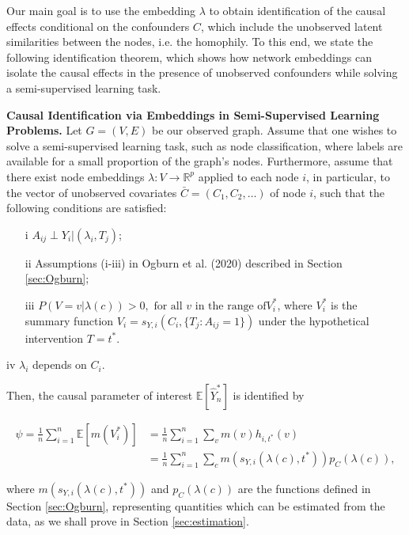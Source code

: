 \documentclass{article}
\begin{document}
Our main goal is to use the embedding $\lambda$ to obtain identification of the causal effects conditional on the confounders $C$, which include the unobserved latent similarities between the nodes, i.e. the homophily. To this end, we state the following identification theorem, which shows how network embeddings can isolate the causal effects in the presence of unobserved confounders while solving a semi-supervised learning task. 

\begin{theorem} \textbf{Causal Identification via Embeddings in Semi-Supervised Learning Problems.}
\label{thm:identification}
Let $G = (V, E)$ be our observed graph. Assume that one wishes to solve a semi-supervised learning task, such as node classification, where labels are available for a small proportion of the graph's nodes. Furthermore, assume that there exist node embeddings $\lambda: V \to \mathbb{R}^p$ applied to each node $i$, in particular, to the vector of unobserved covariates $\bar{C} = (C_1, C_2, \hdots)$ of node $i$, such that the following conditions are satisfied:


\begin{itemize}
\item[i]  $A_{ij} \perp Y_i | (\lambda_i, T_j)$;
\item[ii]  Assumptions (i-iii) in Ogburn et al. (2020) \cite{Ogburn2020} described in Section \ref{sec:Ogburn};
\item[iii] $P(V = v| \lambda(c)) > 0, \mbox{ for all } v \mbox{ in the range of} V_i^*$, where $V_i^*$ is the summary function $V_i = s_{Y, i}(C_i, \{T_j: A_{ij} =1\})$ under the hypothetical intervention $T = t^*$. 
\end{itemize}
\item[iv] $\lambda_i$ depends on $C_i$. 

Then, the causal parameter of interest  $\mathbb{E}[\hat{Y}_n^*]$ is identified by

\begin{align}
\label{eqn:identification}
\psi = \frac{1}{n} \sum_{i=1}^n \mathbb{E}[m(V_i^*)] &= \frac{1}{n} \sum_{i=1}^n \sum_v m(v) h_{i, t^*} (v) \\
&= \frac{1}{n} \sum_{i=1}^n \sum_{c} m(s_{Y, i} (\lambda(c), t^*)) p_C(\lambda(c)),
\end{align}


\noindent where $m(s_{Y, i} (\lambda(c), t^*))$ and $p_C(\lambda(c))$ are the functions defined in Section \ref{sec:Ogburn}, representing quantities which can be estimated from the data, as we shall prove in Section \ref{sec:estimation}.
\end{theorem}
\end{document}
